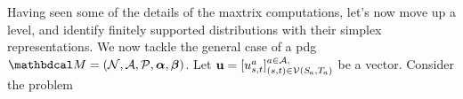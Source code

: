 \documentclass[twoside]{article}
\begin{document}
Having seen some of the details of the maxtrix computations, let's now move up a level, and identify finitely supported distributions with their simplex representations. 
We now tackle the general case of a pdg 
$\dg M = (\N, \Ar, \mathcal P, \balpha, \bbeta)$.
%
Let $\mat u = [u^a_{s,t}]^{a \in \Ar,}_{ (s,t) \in \V(\Src a, \Tgt a)}$
be a vector.
%
Consider the problem
\end{document}
